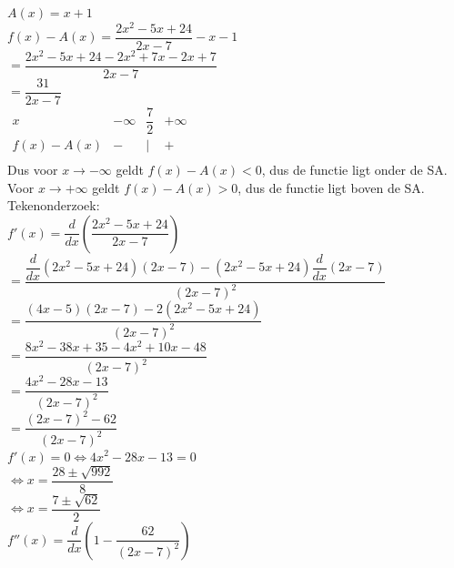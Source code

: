 \documentclass[a4paper]{article}
\begin{document}
$A(x) = x + 1$ \\

$f(x)-A(x) = \dfrac{2x^2 -5x +24}{2x - 7} - x-1$ \\

$= \dfrac{2x^2 -5x +24 - 2x^2+7x-2x+7}{2x - 7}$ \\

$= \dfrac{31}{2x-7}$ \\

$\begin{array}{c|ccc}
    x        & -\infty & \dfrac{7}{2} & +\infty \\ 
    \hline
    f(x)-A(x) & -       & | & + \\ 
\end{array}$ \\

Dus voor $x\to-\infty$ geldt $f(x)-A(x)<0$, dus de functie ligt onder de SA. \\

Voor $x\to+\infty$ geldt $f(x)-A(x)>0$, dus de functie ligt boven de SA. \\

Tekenonderzoek: \\

$f'(x) = \dfrac{d}{dx}\left(\dfrac{2x^2 -5x +24}{2x - 7}\right)$ \\

$= \dfrac{\dfrac{d}{dx}(2x^2 -5x +24)(2x - 7) - (2x^2 -5x +24)\dfrac{d}{dx}(2x - 7)}{(2x - 7)^2}$ \\

$= \dfrac{(4x - 5)(2x - 7) - 2(2x^2 -5x +24)}{(2x - 7)^2}$ \\

$= \dfrac{8x^2 -38x +35 -4x^2 +10x -48}{(2x - 7)^2}$ \\

$= \dfrac{4x^2 -28x -13}{(2x - 7)^2}$ \\

$= \dfrac{(2x - 7)^2 - 62}{(2x - 7)^2}$ \\

$f'(x) = 0 \Leftrightarrow 4x^2 -28x -13 = 0$ \\

$\Leftrightarrow x = \dfrac{28 \pm \sqrt{992}}{8}$ \\

$\Leftrightarrow x = \dfrac{7 \pm \sqrt{62}}{2}$ \\

$f''(x) = \dfrac{d}{dx}\left(1 - \dfrac{62}{(2x - 7)^2}\right)$ \\
\end{document}
